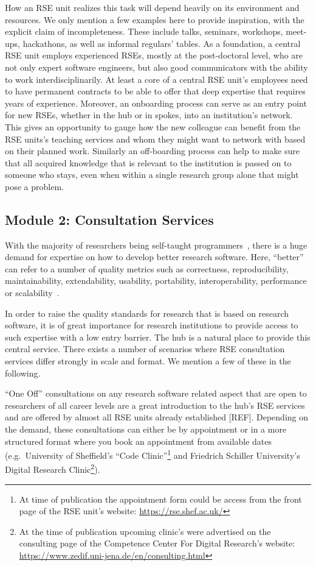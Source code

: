 \documentclass[a4paper]{article}
\begin{document}
How an RSE unit realizes this task will depend heavily on its environment and resources.
We only mention a few examples here to provide inspiration, with the explicit claim of incompleteness.
These include talks, seminars, workshops, meet-ups, hackathons, as well as informal regulars' tables.
As a foundation, a central RSE unit employs experienced RSEs, mostly at the post-doctoral level, who are not only expert software engineers, but also good communicators with the ability to work interdisciplinarily.
At least a core of a central RSE unit's employees need to have permanent contracts to be able to offer that deep expertise that requires years of experience.
Moreover, an onboarding process can serve as an entry point for new RSEs, whether in the hub or in spokes, into an institution's network.
This gives an opportunity to gauge how the new colleague can benefit from the RSE units's teaching services and whom they might want to network with based on their planned work.
Similarly an off-boarding process can help to make sure that all acquired knowledge that is relevant to the institution is passed on to someone who stays, even when within a single research group alone that might pose a problem.

\subsection{Module 2: Consultation Services}%
\label{sec:consultation}

With the majority of researchers being self-taught programmers~\autocite{Carver2013}, there is a huge demand for expertise on how to develop better research software.
Here, “better” can refer to a number of quality metrics such as correctness, reproducibility, maintainability, extendability, usability, portability, interoperability, performance or scalability~\autocite[Chapter 16]{Schulmeyer2008}.

In order to raise the quality standards for research that is based on research software, it is of great importance for research institutions to provide access to such expertise with a low entry barrier.
The hub is a natural place to provide this central service.
There exists a number of scenarios where RSE consultation services differ strongly in scale and format.
We mention a few of these in the following.

“One Off” consultations on any research software related aspect that are open to researchers of all career levels are
a great introduction to the hub's RSE services and are offered by almost all RSE units already established [REF].
Depending on the demand, these consultations can either be by appointment or in a more structured format where you book an appointment from available dates (e.g.\ University of Sheffield's “Code Clinic”\footnote{At time of publication the appointment form could be access from the front page of the RSE unit’s website: \url{https://rse.shef.ac.uk/}} and Friedrich Schiller University’s Digital Research Clinic\footnote{At the time of publication upcoming clinic’s were advertised on the consulting page of the Competence Center For Digital Research’s website: \url{https://www.zedif.uni-jena.de/en/consulting.html}}).
\end{document}
